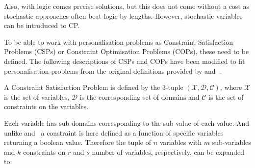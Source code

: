Also, with logic comes precise solutions, but this does not come without a cost as stochastic approaches often beat logic by lengths. However, stochastic variables can be introduced to CP.

To be able to work with personalisation problems as Constraint Satisfaction Problems (CSPs) or Constraint Optimisation Problems (COPs), these need to be defined. The following descriptions of CSPs and COPs have been modified to fit personalisation problems from the original definitions provided by \cite{AIRussell} and~\cite{CPApt}.

A Constraint Satisfaction Problem is defined by the 3-tuple $(\mathcal{X}, \mathcal{D}, \mathcal{C})$, where $\mathcal{X}$ is the set of variables, $\mathcal{D}$ is the corresponding set of domains and $\mathcal{C}$ is the set of constraints on the variables.

Each variable has sub-domains corresponding to the sub-value of each value. And unlike \cite{AIRussell} and~\cite{CPApt} a constraint is here defined as a function of specific variables returning a boolean value. Therefore the tuple of $n$ variables with $m$ sub-variables and $k$ constraints on $r$ and $s$ number of variables, respectively, can be expanded to:

